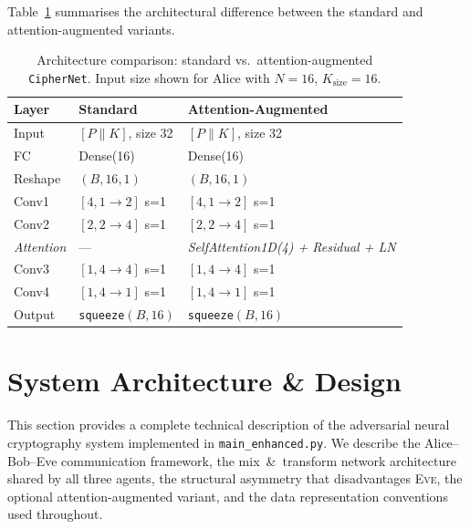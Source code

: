 \documentclass[12pt, a4paper]{article}
\newcommand{\eve}{\textsc{Eve}}
\newcommand{\code}[1]{\texttt{\color{CodeRed}#1}}
\begin{document}
Table~\ref{tab:arch_comparison} summarises the architectural
difference between the standard and attention-augmented variants.

\begin{table}[H]
  \centering
  \caption{Architecture comparison: standard vs.\ attention-augmented
           \code{CipherNet}. Input size shown for Alice with
           $N=16$, $K_{\text{size}}=16$.}
  \label{tab:arch_comparison}
  \small
  \begin{tabular}{@{} l l l @{}}
    \toprule
    \textbf{Layer} & \textbf{Standard} & \textbf{Attention-Augmented} \\
    \midrule
    Input          & $[P \| K]$, size 32  & $[P \| K]$, size 32 \\
    FC             & Dense(16)            & Dense(16) \\
    Reshape        & $(B, 16, 1)$         & $(B, 16, 1)$ \\
    Conv1          & $[4,1{\to}2]$ s=1    & $[4,1{\to}2]$ s=1 \\
    Conv2          & $[2,2{\to}4]$ s=1    & $[2,2{\to}4]$ s=1 \\
    \textit{Attention} & ---              & \textit{SelfAttention1D(4) + Residual + LN} \\
    Conv3          & $[1,4{\to}4]$ s=1    & $[1,4{\to}4]$ s=1 \\
    Conv4          & $[1,4{\to}1]$ s=1    & $[1,4{\to}1]$ s=1 \\
    Output         & \code{squeeze}$(B, 16)$  & \code{squeeze}$(B, 16)$ \\
    \bottomrule
  \end{tabular}
\end{table}

\newpage
\section{System Architecture \& Design}
\label{sec:architecture}

This section provides a complete technical description of the adversarial
neural cryptography system implemented in \code{main\_enhanced.py}.
We describe the Alice--Bob--Eve communication framework, the mix~\&~transform
network architecture shared by all three agents, the structural asymmetry
that disadvantages \eve{}, the optional attention-augmented variant, and the
data representation conventions used throughout.
\end{document}
